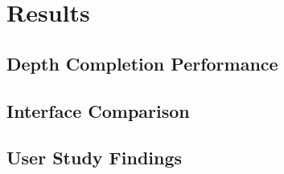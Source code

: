 
\chapter{Results}\label{chapter:results}

\section{Depth Completion Performance}

\section{Interface Comparison}

\section{User Study Findings}